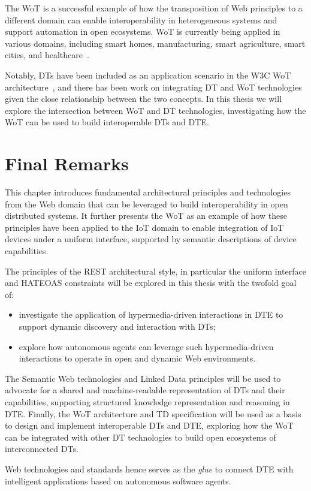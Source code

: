 The \ac{WoT} is a successful example of how the transposition of Web principles to a different domain can enable interoperability in heterogeneous systems and support automation in open ecosystems.
%
\ac{WoT} is currently being applied in various domains, including smart homes, manufacturing, smart agriculture, smart cities, and healthcare~\cite{Sciullo_Gigli_Montori_Trotta_Felice_2022}.

Notably, \acp{DT} have been included as an application scenario in the \ac{W3C} \ac{WoT} architecture~\cite{wot-arch}, and there has been work on integrating \ac{DT} and \ac{WoT} technologies~\cite{Jacoby_Usländer_2020,SciulloWoTwins2022} given the close relationship between the two concepts.
%
In this thesis we will explore the intersection between \ac{WoT} and \ac{DT} technologies, investigating how the \ac{WoT} can be used to build interoperable \acp{DT} and \ac{DTE}.

\section{Final Remarks}

This chapter introduces fundamental architectural principles and technologies from the Web domain that can be leveraged to build interoperability in open distributed systems.
%
It further presents the \ac{WoT} as an example of how these principles have been applied to the \ac{IoT} domain to enable integration of \ac{IoT} devices under a uniform interface, supported by semantic descriptions of device capabilities.

The principles of the \ac{REST} architectural style, in particular the uniform interface and \ac{HATEOAS} constraints will be explored in this thesis with the twofold goal of:
\begin{itemize}
    \item investigate the application of hypermedia-driven interactions in \ac{DTE} to support dynamic discovery and interaction with \acp{DT};
    \item explore how autonomous agents can leverage such hypermedia-driven interactions to operate in open and dynamic Web environments. 
\end{itemize}
%
The Semantic Web technologies and Linked Data principles will be used to advocate for a shared and machine-readable representation of \acp{DT} and their capabilities, supporting structured knowledge representation and reasoning in \ac{DTE}. 
%
Finally, the \ac{WoT} architecture and \ac{TD} specification will be used as a basis to design and implement interoperable \acp{DT} and \ac{DTE}, exploring how the \ac{WoT} can be integrated with other \ac{DT} technologies to build open ecosystems of interconnected \acp{DT}.

Web technologies and standards hence serves as the \emph{glue} to connect \ac{DTE} with intelligent applications based on autonomous software agents. 